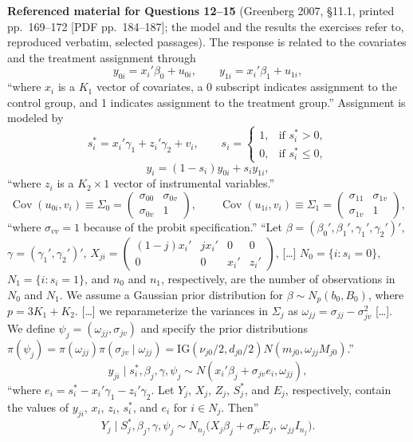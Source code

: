 \documentclass[11pt,a4paper]{article}
\begin{document}
\noindent\textbf{Referenced material for Questions 12--15} (Greenberg 2007, \S11.1, printed pp.~169--172
[PDF pp.~184--187]; the model and the results the exercises refer to, reproduced verbatim, selected passages). The response is related to the
covariates and the treatment assignment through
\[
y_{0i}=x_i'\beta_0+u_{0i},\qquad y_{1i}=x_i'\beta_1+u_{1i},\tag{11.1}
\]
``where $x_i$ is a $K_1$ vector of covariates, a 0 subscript indicates assignment to the control group, and
1 indicates assignment to the treatment group.'' Assignment is modeled by
\[
s_i^*=x_i'\gamma_1+z_i'\gamma_2+v_i,\qquad s_i=\begin{cases}1,&\text{if }s_i^*>0,\\0,&\text{if }s_i^*\leq0,\end{cases}\tag{11.2}
\]
\[
y_i=(1-s_i)y_{0i}+s_iy_{1i},\tag{11.3}
\]
``where $z_i$ is a $K_2\times1$ vector of instrumental variables.''
\[
\operatorname{Cov}(u_{0i},v_i)\equiv\Sigma_0=\begin{pmatrix}\sigma_{00}&\sigma_{0v}\\\sigma_{0v}&1\end{pmatrix},\qquad
\operatorname{Cov}(u_{1i},v_i)\equiv\Sigma_1=\begin{pmatrix}\sigma_{11}&\sigma_{1v}\\\sigma_{1v}&1\end{pmatrix},
\]
``where $\sigma_{vv}=1$ because of the probit specification.'' ``Let $\beta=(\beta_0',\beta_1',\gamma_1',\gamma_2')'$,
$\gamma=(\gamma_1',\gamma_2')'$,
$X_{ji}=\begin{pmatrix}(1-j)x_i'&jx_i'&0&0\\0&0&x_i'&z_i'\end{pmatrix}$, [\dots] $N_0=\{i:s_i=0\}$,
$N_1=\{i:s_i=1\}$, and $n_0$ and $n_1$, respectively, are the number of observations in $N_0$ and $N_1$. We
assume a Gaussian prior distribution for $\beta\sim N_p(b_0,B_0)$, where $p=3K_1+K_2$. [\dots] we
reparameterize the variances in $\Sigma_j$ as $\omega_{jj}=\sigma_{jj}-\sigma_{jv}^2$ [\dots]. We define
$\psi_j=(\omega_{jj},\sigma_{jv})$ and specify the prior distributions
$\pi(\psi_j)=\pi(\omega_{jj})\pi(\sigma_{jv}\mid\omega_{jj})=\mathrm{IG}(\nu_{j0}/2,d_{j0}/2)N(m_{j0},\omega_{jj}M_{j0})$.''
\[
y_{ji}\mid s_i^*,\beta_j,\gamma,\psi_j\sim N(x_i'\beta_j+\sigma_{jv}e_i,\omega_{jj}),\tag{11.4}
\]
``where $e_i=s_i^*-x_i'\gamma_1-z_i'\gamma_2$. Let $Y_j$, $X_j$, $Z_j$, $S_j^*$, and $E_j$, respectively, contain
the values of $y_{ji}$, $x_i$, $z_i$, $s_i^*$, and $e_i$ for $i\in N_j$. Then''
\[
Y_j\mid S_j^*,\beta_j,\gamma,\psi_j\sim N_{n_j}\big(X_j\beta_j+\sigma_{jv}E_j,\ \omega_{jj}I_{n_j}\big).\tag{11.5}
\]
\end{document}
